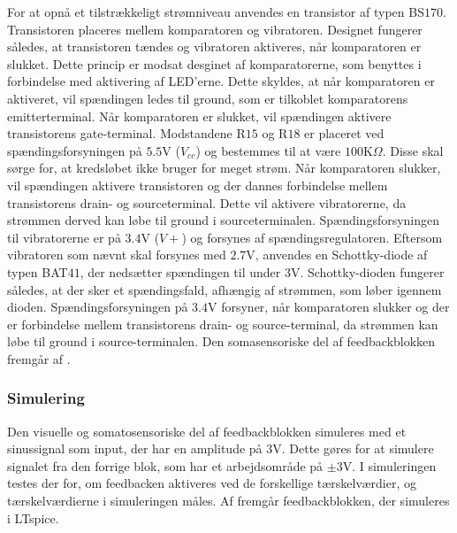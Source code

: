 For at opnå et tilstrækkeligt strømniveau anvendes en transistor af typen BS$170$. Transistoren placeres mellem komparatoren og vibratoren. Designet fungerer således, at transistoren tændes og vibratoren aktiveres, når komparatoren er slukket. Dette princip er modsat desginet af komparatorerne, som benyttes i forbindelse med aktivering af LED'erne. Dette skyldes, at når komparatoren er aktiveret, vil spændingen ledes til ground, som er tilkoblet komparatorens emitterterminal. Når komparatoren er slukket, vil spændingen aktivere transistorens gate-terminal. Modstandene R$15$ og R$18$ er placeret ved spændingsforsyningen på $5.5$V ($V_{cc}$) og bestemmes til at være $100$K$\Omega$. Disse skal sørge for, at kredsløbet ikke bruger for meget strøm. Når komparatoren slukker, vil spændingen aktivere transistoren og der dannes forbindelse mellem transistorens drain- og sourceterminal. Dette vil aktivere vibratorerne, da strømmen derved kan løbe til ground i sourceterminalen. Spændingsforsyningen til vibratorerne er på $3.4$V ($V+$) og forsynes af spændingsregulatoren. Eftersom vibratoren som nævnt skal forsynes med $2.7$V, anvendes en Schottky-diode af typen BAT$41$, der nedsætter spændingen til under $3$V. Schottky-dioden fungerer således, at der sker et spændingsfald, afhængig af strømmen, som løber igennem dioden. Spændingsforsyningen på $3.4$V forsyner, når komparatoren slukker og der er forbindelse mellem transistorens drain- og source-terminal, da strømmen kan løbe til ground i source-terminalen. Den somasensoriske del af feedbackblokken fremgår af .
 
\subsubsection{Simulering}\label{feedback_simulering}
Den visuelle og somatosensoriske del af feedbackblokken simuleres med et sinussignal som input, der har en amplitude på $3$V. Dette gøres for at simulere signalet fra den forrige blok, som har et arbejdsområde på $\pm3$V. I simuleringen testes der for, om feedbacken aktiveres ved de forskellige tærskelværdier, og tærskelværdierne i simuleringen måles.
Af  fremgår feedbackblokken, der simuleres i LTspice.

